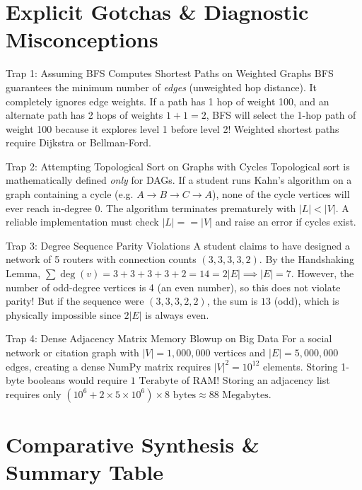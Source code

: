 \section{Explicit Gotchas \& Diagnostic Misconceptions}

\begin{trapbox}{Trap 1: Assuming BFS Computes Shortest Paths on Weighted Graphs}
BFS guarantees the minimum number of \textit{edges} (unweighted hop distance). It completely ignores edge weights. If a path has 1 hop of weight 100, and an alternate path has 2 hops of weights $1 + 1 = 2$, BFS will select the 1-hop path of weight 100 because it explores level 1 before level 2! Weighted shortest paths require Dijkstra or Bellman-Ford.
\end{trapbox}

\begin{trapbox}{Trap 2: Attempting Topological Sort on Graphs with Cycles}
Topological sort is mathematically defined \textit{only} for DAGs. If a student runs Kahn's algorithm on a graph containing a cycle (e.g. $A \to B \to C \to A$), none of the cycle vertices will ever reach in-degree 0. The algorithm terminates prematurely with $|L| < |V|$. A reliable implementation must check $|L| == |V|$ and raise an error if cycles exist.
\end{trapbox}

\begin{trapbox}{Trap 3: Degree Sequence Parity Violations}
A student claims to have designed a network of 5 routers with connection counts $(3, 3, 3, 3, 2)$. By the Handshaking Lemma, $\sum \deg(v) = 3 + 3 + 3 + 3 + 2 = 14 = 2|E| \implies |E| = 7$. However, the number of odd-degree vertices is 4 (an even number), so this does not violate parity! But if the sequence were $(3, 3, 3, 2, 2)$, the sum is $13$ (odd), which is physically impossible since $2|E|$ is always even.
\end{trapbox}

\begin{trapbox}{Trap 4: Dense Adjacency Matrix Memory Blowup on Big Data}
For a social network or citation graph with $|V| = 1,000,000$ vertices and $|E| = 5,000,000$ edges, creating a dense NumPy matrix requires $|V|^2 = 10^{12}$ elements. Storing 1-byte booleans would require $1 \text{ Terabyte}$ of RAM! Storing an adjacency list requires only $(10^6 + 2 \times 5 \times 10^6) \times 8 \text{ bytes} \approx 88 \text{ Megabytes}$.
\end{trapbox}

\section{Comparative Synthesis \& Summary Table}


